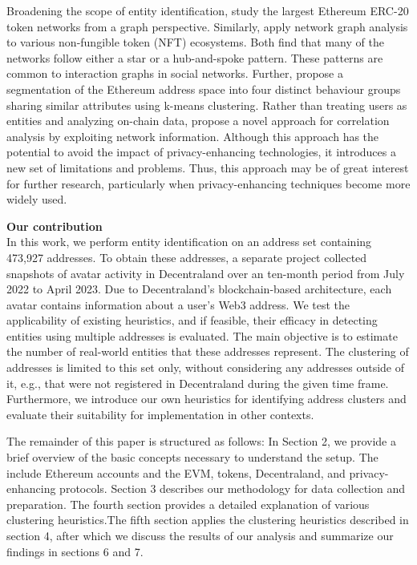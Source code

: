 \documentclass[12pt,a4paper,titlepage,oneside,english]{article}
\begin{document}
Broadening the scope of entity identification, \cite{victorlüders2019} study the largest Ethereum ERC-20 token networks from a graph perspective. Similarly, \cite{casalebrunet2021} apply network graph analysis to various non-fungible token (NFT) ecosystems. Both find that many of the networks follow either a star or a hub-and-spoke pattern. These patterns are common to interaction graphs in social networks. Further, \cite{Payette2017} propose a segmentation of the Ethereum address space into four distinct behaviour groups sharing similar attributes using k-means clustering. \newline
Rather than treating users as entities and analyzing on-chain data, \cite{yu2023} propose a novel approach for correlation analysis by exploiting network information. Although this approach has the potential to avoid the impact of privacy-enhancing technologies, it introduces a new set of limitations and problems. Thus, this approach may be of great interest for further research, particularly when privacy-enhancing techniques become more widely used.


\textbf{Our contribution}\\
In this work, we perform entity identification on an address set containing 473,927 addresses. To obtain these addresses, a separate project collected snapshots of avatar activity in Decentraland over an ten-month period from July 2022 to April 2023. Due to Decentraland's blockchain-based architecture, each avatar contains information about a user's Web3 address. \newline
We test the applicability of existing heuristics, and if feasible, their efficacy in detecting entities using multiple addresses is evaluated.
The main objective is to estimate the number of real-world entities that these addresses represent. The clustering of addresses is limited to this set only, without considering any %
 addresses outside of it, e.g., that were not registered in Decentraland during the given time frame.
Furthermore, we introduce our own heuristics for identifying address clusters and evaluate their suitability for implementation in other contexts.

The remainder of this paper is structured as follows: In Section 2, we provide a brief overview of the basic concepts necessary to understand the setup. The include Ethereum accounts and the EVM, tokens, Decentraland, and privacy-enhancing protocols. Section 3 describes our methodology for data collection and preparation. The fourth section provides a detailed explanation of various clustering heuristics.The fifth section applies the clustering heuristics described in section 4, after which we discuss the results of our analysis and summarize our findings in sections 6 and 7.
\end{document}
